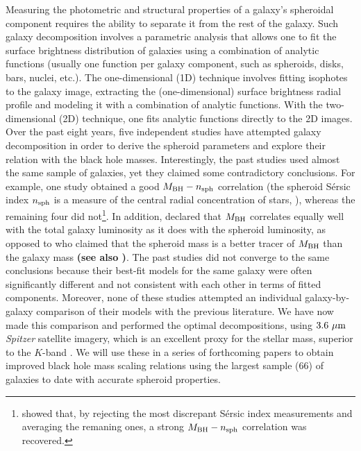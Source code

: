 \documentclass[preprint2]{emulateapj}
\begin{document}
Measuring the photometric and structural properties of a galaxy's spheroidal component 
requires the ability to separate it from the rest of the galaxy. 
Such galaxy decomposition involves a parametric analysis that allows one to fit the surface brightness distribution
of galaxies using a combination of analytic functions (usually one function per
galaxy component, such as spheroids, disks, bars, nuclei, etc.).
The one-dimensional (1D) technique involves fitting isophotes to the galaxy image, extracting the (one-dimensional) surface 
brightness radial profile and modeling it with a combination of analytic functions.
With the two-dimensional (2D) technique, one fits analytic functions directly to the 2D images. \\
Over the past eight years, five independent studies 
\citep{grahamdriver2007,sani2011,vika2012,beifiori2012,lasker2014data,lasker2014anal} have attempted galaxy decomposition
in order to derive the spheroid parameters and explore their relation with the black hole masses. 
Interestingly, the past studies used almost the same sample of galaxies, yet they claimed some contradictory conclusions.
For example, one study \citep{grahamdriver2007} obtained a good $M_{\rm BH}-n_{\rm sph}$ correlation 
(the spheroid S\'ersic index $n_{\rm sph}$ is a measure of the central radial concentration of stars, \citealt{trujillo2001}), 
whereas the remaining four did not\footnote{\cite{savorgnan2013} showed that, 
by rejecting the most discrepant S\'ersic index measurements and averaging the remaning ones, 
a strong $M_{\rm BH}-n_{\rm sph}$ correlation was recovered. }.
In addition, \cite{lasker2014anal} 
declared that $M_{\rm BH}$ correlates equally well with the total galaxy luminosity as it does with the spheroid luminosity, 
as opposed to \cite{beifiori2012} who claimed that the spheroid mass is a better tracer of $M_{\rm BH}$ than the galaxy mass 
{\bf (see also \citealt{kormendygebhardt2001,erwingadotti2012})}.
The past studies did not converge to the same conclusions 
because their best-fit models for the same galaxy were often 
significantly different and not consistent with each other in terms of fitted components. 
Moreover, none of these studies attempted an individual galaxy-by-galaxy 
comparison of their models with the previous literature. 
We have now made this comparison and performed the optimal decompositions,
using $3.6~\rm \mu m$ \emph{Spitzer} satellite imagery, 
which is an excellent proxy for the stellar mass, superior to the $K$-band \citep{junim2008,sheth2010}.
We will use these in a series of forthcoming papers to obtain improved black hole mass scaling relations 
using the largest sample (66) of galaxies to date with accurate spheroid properties. \\
\end{document}

